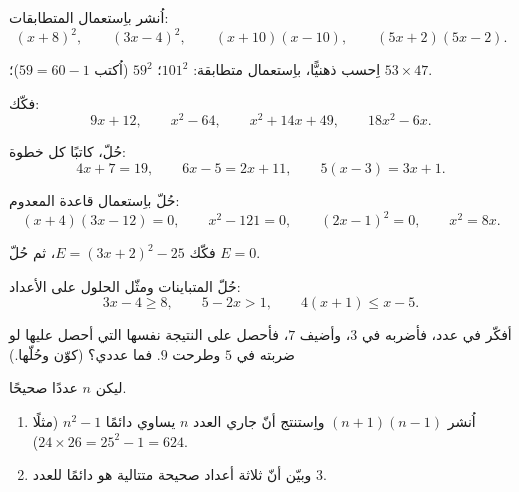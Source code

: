 \begin{exercise}[$\star$]\label{exo:g9:algebra:2}
اُنشر باِستعمال المتطابقات:
\[
(x + 8)^2, \qquad
(3x - 4)^2, \qquad
(x + 10)(x - 10), \qquad
(5x + 2)(5x - 2).
\]
\end{exercise}

\begin{exercise}[$\star$]\label{exo:g9:algebra:3}
اِحسب ذهنيًّا، باِستعمال متطابقة: $101^2$؛ \quad $59^2$
(اُكتب $59 = 60 - 1$)؛ \quad $53 \times 47$.
\end{exercise}

\begin{exercise}[$\star$]\label{exo:g9:algebra:4}
فكّك:
\[
9x + 12, \qquad
x^2 - 64, \qquad
x^2 + 14x + 49, \qquad
18x^2 - 6x .
\]
\end{exercise}

\begin{exercise}[$\star$]\label{exo:g9:algebra:5}
حُلّ، كاتبًا كل خطوة:
\[
4x + 7 = 19, \qquad
6x - 5 = 2x + 11, \qquad
5(x - 3) = 3x + 1 .
\]
\end{exercise}

\begin{exercise}[$\star\star$]\label{exo:g9:algebra:6}
حُلّ باِستعمال قاعدة  المعدوم:
\[
(x + 4)(3x - 12) = 0, \qquad
x^2 - 121 = 0, \qquad
(2x - 1)^2 = 0, \qquad
x^2 = 8x .
\]
\end{exercise}

\begin{exercise}[$\star\star$]\label{exo:g9:algebra:7}
فكّك $E = (3x + 2)^2 - 25$، ثم حُلّ $E = 0$.
\end{exercise}

\begin{exercise}[$\star\star$]\label{exo:g9:algebra:8}
حُلّ المتباينات ومثّل الحلول على  الأعداد:
\[
3x - 4 \geq 8, \qquad
5 - 2x > 1, \qquad
4(x + 1) \leq x - 5 .
\]
\end{exercise}

\begin{exercise}[$\star\star$]\label{exo:g9:algebra:9}
أفكّر في عدد، فأضربه في $3$، وأضيف $7$، فأحصل على النتيجة نفسها
التي أحصل عليها لو ضربته في $5$ وطرحت $9$. فما عددي؟
(كوّن  وحُلّها.)
\end{exercise}

\begin{exercise}[$\star\star\star$]\label{exo:g9:algebra:10}
ليكن $n$ عددًا صحيحًا.
\begin{enumerate}
  \item اُنشر $(n + 1)(n - 1)$ واِستنتج أنّ  جاري العدد
        $n$ يساوي دائمًا $n^2 - 1$ (مثلًا $24 \times 26 =
        25^2 - 1 = 624$).
  \item وبيّن أنّ  ثلاثة أعداد صحيحة متتالية هو دائمًا
         للعدد $3$.
\end{enumerate}
\end{exercise}

